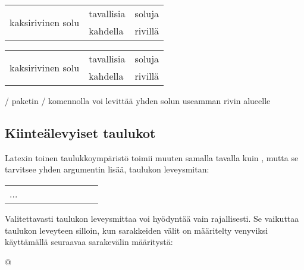 \begin{esimerkki*}
  \komentoi{\keno}

\begin{koodilohko}
\begin{tabular}{|l|l|l|}
  \hline
  \multirow{2}{*}{kaksirivinen solu} & tavallisia & soluja \\
  \cline{2-3}
                                     & kahdella   & rivillä \\
  \hline
\end{tabular}
\end{koodilohko}

  \begin{tulos}
    \renewcommand{\arraystretch}{1.3}
    \begin{tabular}{|l|l|l|}
      \hline
      \multirow{2}{*}[-1bp]{kaksirivinen solu} & tavallisia & soluja \\
      \cline{2-3}
                                               & kahdella & rivillä \\
      \hline
    \end{tabular}
  \end{tulos}

  \caption{\-/ paketin \-/
    komennolla voi levittää yhden solun useamman rivin alueelle}
  \label{esim/taulukko-multirow}
\end{esimerkki*}

\subsection{Kiinteälevyiset taulukot}

Latexin toinen taulukkoympäristö  toimii muuten
samalla tavalla kuin , mutta se tarvitsee yhden
argumentin lisää, taulukon leveysmitan:

\begin{koodilohkosis}
\begin{tabular*}{leveys}[sijainti]{sarakkeet}
  ...
\end{tabular*}
\end{koodilohkosis}

\noindent
Valitettavasti taulukon leveysmittaa voi hyödyntää vain rajallisesti. Se
vaikuttaa taulukon leveyteen silloin, kun sarakkeiden välit on
määritelty venyviksi käyttämällä seuraavaa sarakevälin määritystä:

\begin{koodilohkosis}
@{\extracolsep{\fill}}
\end{koodilohkosis}


